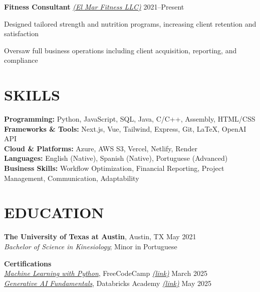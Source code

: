 \documentclass[11pt]{article}
\begin{document}
\textbf{Fitness Consultant} \href{https://elmarfitness.com}{\textit{(El Mar Fitness LLC)}} \hfill 2021--Present
\begin{compactitem}
  \item Designed tailored strength and nutrition programs, increasing client retention and satisfaction
  \item Oversaw full business operations including client acquisition, reporting, and compliance
\end{compactitem}

\section*{SKILLS}

\textbf{Programming:} Python, JavaScript, SQL, Java, C/C++, Assembly, HTML/CSS \\
\textbf{Frameworks \& Tools:} Next.js, Vue, Tailwind, Express, Git, LaTeX, OpenAI API \\
\textbf{Cloud \& Platforms:} Azure, AWS S3, Vercel, Netlify, Render \\
\textbf{Languages:} English (Native), Spanish (Native), Portuguese (Advanced) \\
\textbf{Business Skills:} Workflow Optimization, Financial Reporting, Project Management, Communication, Adaptability

\section*{EDUCATION}

\textbf{The University of Texas at Austin}, Austin, TX \hfill May 2021 \\
\textit{Bachelor of Science in Kinesiology}; Minor in Portuguese

\textbf{Certifications} \\
\textit{\href{https://www.freecodecamp.org/certification/migglenero/machine-learning-with-python-v7}{Machine Learning with Python}}, FreeCodeCamp \href{https://www.freecodecamp.org/certification/migglenero/machine-learning-with-python-v7}{\textit{(link)}} \hfill March 2025 \\
\textit{\href{https://credentials.databricks.com/052cc354-c947-42d8-81bb-40c38d77ace3}{Generative AI Fundamentals}}, Databricks Academy \href{https://credentials.databricks.com/052cc354-c947-42d8-81bb-40c38d77ace3}{\textit{(link)}} \hfill May 2025
\end{document}
